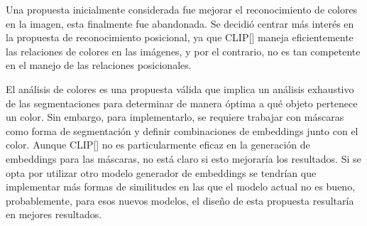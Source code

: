 Una propuesta inicialmente considerada fue mejorar el reconocimiento de colores en la imagen, esta finalmente fue abandonada. Se decidió centrar más interés en la propuesta de reconocimiento posicional, ya que CLIP[\cite{clip}] maneja eficientemente las relaciones de colores en las imágenes, y por el contrario, no es tan competente en el manejo de las relaciones posicionales.

El análisis de colores es una propuesta válida que implica un análisis exhaustivo de las segmentaciones para determinar de manera óptima a qué objeto pertenece un color. Sin embargo, para implementarlo, se requiere trabajar con máscaras como forma de segmentación y definir combinaciones de embeddings junto con el color. Aunque CLIP[\cite{clip}] no es particularmente eficaz en la generación de embeddings para las máscaras, no está claro si esto mejoraría los resultados. Si se opta por utilizar otro modelo generador de embeddings se tendrían que implementar más formas de similitudes en las que el modelo actual no es bueno, probablemente, para esos nuevos modelos, el dise\~no de esta propuesta resultaría en mejores resultados.

